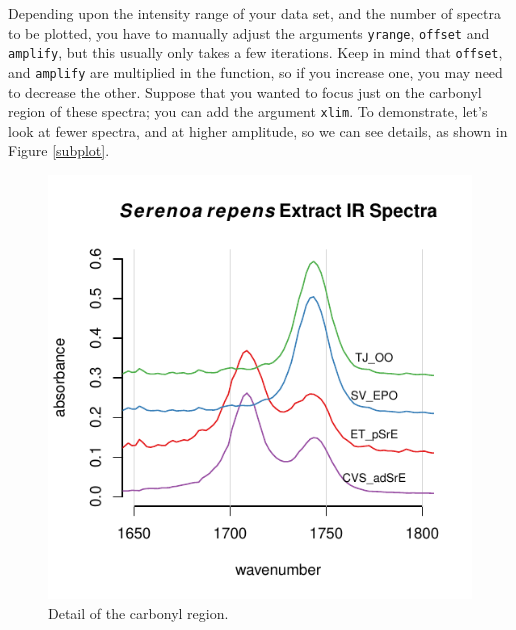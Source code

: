 \documentclass[letter,10pt,twocolumn,twoside,printwatermark=false]{pinp}
\begin{document}
Depending upon the intensity range of your data set, and the number of
spectra to be plotted, you have to manually adjust the arguments
\texttt{yrange}, \texttt{offset} and \texttt{amplify}, but this usually
only takes a few iterations. Keep in mind that \texttt{offset}, and
\texttt{amplify} are multiplied in the function, so if you increase one,
you may need to decrease the other. Suppose that you wanted to focus
just on the carbonyl region of these spectra; you can add the argument
\texttt{xlim}. To demonstrate, let's look at fewer spectra, and at
higher amplitude, so we can see details, as shown in Figure
\ref{subplot}.

\begin{Shaded}
\begin{Highlighting}[]
   \NormalTok{(}\NormalTok{, }\NormalTok{, }\NormalTok{, }\NormalTok{),}
   \NormalTok{(}\NormalTok{, }\NormalTok{),}
   \NormalTok{,}
   \NormalTok{,}
   \NormalTok{(}\NormalTok{, }\NormalTok{))}
\end{Highlighting}
\end{Shaded}

\begin{figure}

{\centering \includegraphics{ChemoSpec2_files/figure-latex/Chunk10-1} 

}

\caption{\label{subplot}Detail of the carbonyl region.}\label{fig:Chunk10}
\end{figure}
\end{document}
